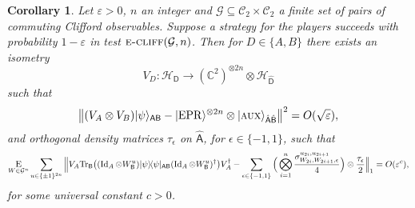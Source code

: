 \documentclass[11pt]{article}
\newtheorem{corollary}[theorem]{Corollary}
\theoremstyle{remark}
\theoremstyle{definition}
\newcommand{\ket}[1]{|#1\rangle}
\newcommand{\bra}[1]{\langle#1|}
\newcommand{\proj}[1]{\ket{#1}\!\bra{#1}}
\newcommand{\Tr}{\mbox{\rm Tr}}
\newcommand{\Id}{\ensuremath{\mathop{\rm Id}\nolimits}}
\newcommand{\reg}[1]{{\textsf{#1}}}
\newcommand{\C}{\ensuremath{\mathbb{C}}}
\newcommand{\mH}{\mathcal{H}}
\newcommand{\eps}{\varepsilon}
\newcommand{\EPR}{{\rm EPR}}
\newcommand{\aux}{\textsc {aux}}
\newcommand{\ecliff}{\textsc{e-cliff}}
\newcommand{\cliffordgb}{{\mathcal{C}_2}}
\begin{document}
\begin{corollary}\label{cor:clifford-rigid}
Let $\eps>0$, $n$ an integer and $\mathcal{G} \subseteq \cliffordgb\times\cliffordgb$ a finite set of pairs of commuting Clifford observables. Suppose a strategy for the players succeeds with probability $1-\eps$ in test $\ecliff(\mathcal{G},n)$. Then for $D\in\{A,B\}$ there exists an isometry 
$$V_D: \mathcal{H}_\reg{D} \to (\C^2)^{\otimes 2n} \otimes {\mH}_{\hat{\reg{D}}}$$
such that
$$ \big\| (V_A \otimes V_B) \ket{\psi}_{\reg{AB}}  - \ket{\EPR}^{\otimes 2n} \otimes \ket{\aux}_{\hat{\reg{A}}\hat{\reg{B}}} \big\|^2 = O(\sqrt{\eps}),$$
and orthogonal density matrices $\tau_\epsilon$ on $\hat{\reg{A}}$, for $\epsilon\in\{-1,1\}$, such that
$$ \mathop{\textsc{E}}_{W\in\mathcal{G}^n} \sum_{u\in\{\pm 1\}^{2n}} \Big\| V_A \Tr_{\reg{B}}\big((\Id_A \otimes W_{\reg{B}}^u) \proj{\psi}_{\reg{AB}} (\Id_A \otimes W_{\reg{B}}^u)^\dagger\big) V_A^\dagger - \sum_{\epsilon\in\{-1,1\}} \Big( \bigotimes_{i=1}^n \frac{\sigma_{W_{2i},W_{2i+1},\epsilon}^{u_{2i},u_{2i+1}}}{4}\Big)\otimes \frac{\tau_\epsilon}{2}   \Big\|_1 = O(\eps^c),$$
for some universal constant $c>0$. 
\end{corollary}
\end{document}
